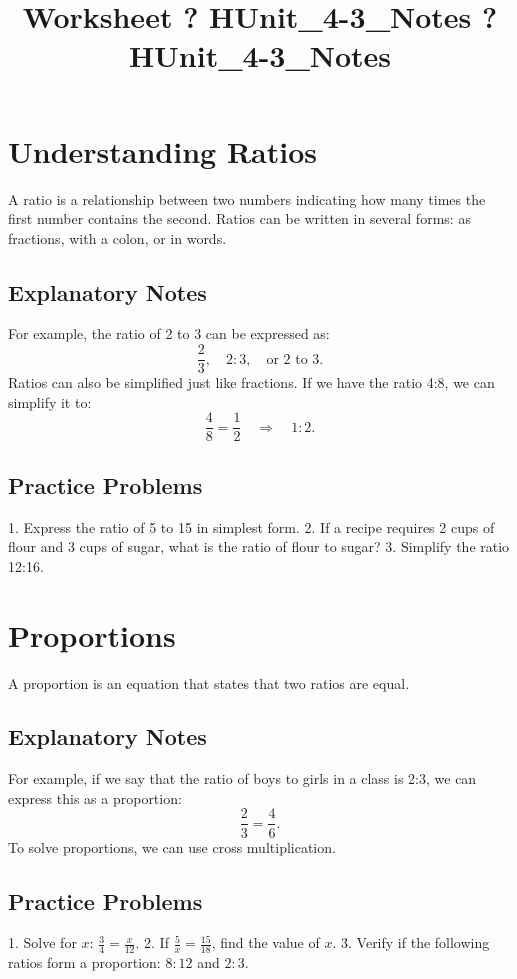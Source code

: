 \documentclass{article}
\title{Worksheet ? HUnit\_4-3\_Notes ? HUnit\_4-3\_Notes}
\author{}
\date{}
\begin{document}
\maketitle

\section*{Understanding Ratios}
A ratio is a relationship between two numbers indicating how many times the first number contains the second. Ratios can be written in several forms: as fractions, with a colon, or in words.

\subsection*{Explanatory Notes}
For example, the ratio of 2 to 3 can be expressed as:
\[
\frac{2}{3}, \quad 2:3, \quad \text{or } 2 \text{ to } 3.
\]
Ratios can also be simplified just like fractions. If we have the ratio 4:8, we can simplify it to:
\[
\frac{4}{8} = \frac{1}{2} \quad \Rightarrow \quad 1:2.
\]

\subsection*{Practice Problems}
1. Express the ratio of 5 to 15 in simplest form.
2. If a recipe requires 2 cups of flour and 3 cups of sugar, what is the ratio of flour to sugar?
3. Simplify the ratio 12:16.

\section*{Proportions}
A proportion is an equation that states that two ratios are equal. 

\subsection*{Explanatory Notes}
For example, if we say that the ratio of boys to girls in a class is 2:3, we can express this as a proportion:
\[
\frac{2}{3} = \frac{4}{6}.
\]
To solve proportions, we can use cross multiplication.

\subsection*{Practice Problems}
1. Solve for \(x\): \(\frac{3}{4} = \frac{x}{12}\).
2. If \(\frac{5}{x} = \frac{15}{18}\), find the value of \(x\).
3. Verify if the following ratios form a proportion: \(8:12\) and \(2:3\).
\end{document}
